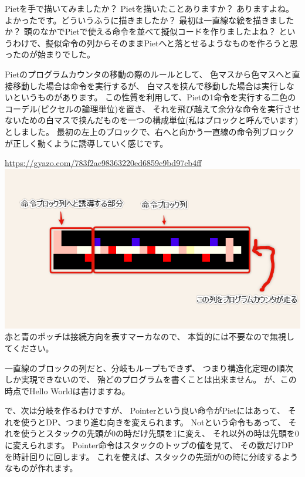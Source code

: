 Pietを手で描いてみましたか？ Pietを描いたことありますか？ ありますよね。
よかったです。どういうふうに描きましたか？
最初は一直線な絵を描きましたか？
頭のなかでPietで使える命令を並べて擬似コードを作りましたよね？
というわけで、擬似命令の列からそのままPietへと落とせるようなものを作ろうと思ったのが始まりでした。

Pietのプログラムカウンタの移動の際のルールとして、
色マスから色マスへと直接移動した場合は命令を実行するが、
白マスを挟んで移動した場合は実行しないというものがあります。
この性質を利用して、Pietの1命令を実行する二色のコーデル(ピクセルの論理単位)を置き、
それを飛び越えて余分な命令を実行させないための白マスで挟んだものを一つの構成単位(私はブロックと呼んでいます)としました。
最初の左上のブロックで、右へと向かう一直線の命令列ブロックが正しく動くように誘導していく感じです。

\url{https://gyazo.com/783f2ae98363220ed6859c9bd97cb4ff}\\
\href{https://gyazo.com/783f2ae98363220ed6859c9bd97cb4ff}{\includegraphics[width=\textwidth]{images/783f2ae98363220ed6859c9bd97cb4ff.png}} \\
赤と青のポッチは接続方向を表すマーカなので、
本質的には不要なので無視してください。

一直線のブロックの列だと、分岐もループもできず、
つまり構造化定理の順次しか実現できないので、
殆どのプログラムを書くことは出来ません。
が、この時点でHello Worldは書けますね。

で、次は分岐を作るわけですが、 Pointerという良い命令がPietにはあって、
それを使うとDP、つまり進む向きを変えられます。 Notという命令もあって、
それを使うとスタックの先頭が0の時だけ先頭を1に変え、
それ以外の時は先頭を0に変えられます。
Pointer命令はスタックのトップの値を見て、
その数だけDPを時計回りに回します。
これを使えば、スタックの先頭が0の時に分岐するようなものが作れます。

